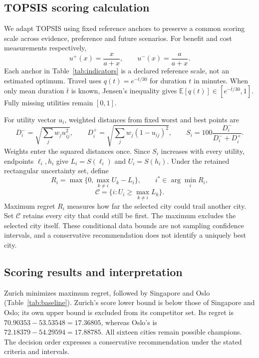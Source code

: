\subsection{TOPSIS scoring calculation}
We adapt TOPSIS \cite{topsis} using fixed reference anchors to preserve a common scoring scale across evidence,
preference and future scenarios. For benefit and cost measurements respectively,
\begin{equation}
 u^{+}(x)=\frac{x}{a+x},\qquad u^{-}(x)=\frac{a}{a+x}.
\end{equation}
Each anchor in Table~\ref{tab:indicators} is a declared reference scale, not
an estimated optimum. Travel uses $q(t)=e^{-t/30}$ for duration $t$ in minutes.
When only mean duration $\bar t$ is known, Jensen's inequality gives
$\mathbb E[q(t)]\in[e^{-\bar t/30},1]$. Fully missing utilities remain $[0,1]$.

For utility vector $u_i$, weighted distances from fixed worst and best points are
\begin{equation}
 D_i^-=\sqrt{\sum_jw_ju_{ij}^2},\qquad
 D_i^+=\sqrt{\sum_jw_j(1-u_{ij})^2},\qquad
 S_i=100\frac{D_i^-}{D_i^-+D_i^+}.
\end{equation}
Weights enter the squared distances once. Since $S_i$ increases with every
utility, endpoints $\ell_i,h_i$ give $L_i=S(\ell_i)$ and $U_i=S(h_i)$.
Under the retained rectangular uncertainty set, define
\begin{equation}
 R_i=\max\{0,\max_{k\ne i}U_k-L_i\},\qquad
 i^*\in\arg\min_iR_i,
 \label{eq:regret}
\end{equation}
\begin{equation}
 \mathcal C=\{i:U_i\geq\max_{k\ne i}L_k\}.
\end{equation}
Maximum regret $R_i$ measures how far the selected city could trail another
city. Set $\mathcal C$ retains every city that could still be first.
The maximum excludes the selected city itself. These conditional data bounds
are not sampling confidence intervals, and a conservative recommendation does
not identify a uniquely best city.

\subsection{Scoring results and interpretation}
Zurich minimizes maximum regret, followed by Singapore and Oslo
(Table~\ref{tab:baseline}). Zurich's score lower bound is below those of
Singapore and Oslo; its own upper bound is excluded from its competitor set.
Its regret is $70.90353-53.53548=17.36805$, whereas Oslo's is
$72.18379-54.29594=17.88785$. All sixteen cities remain possible champions.
The decision order expresses a conservative recommendation under the stated
criteria and intervals.

